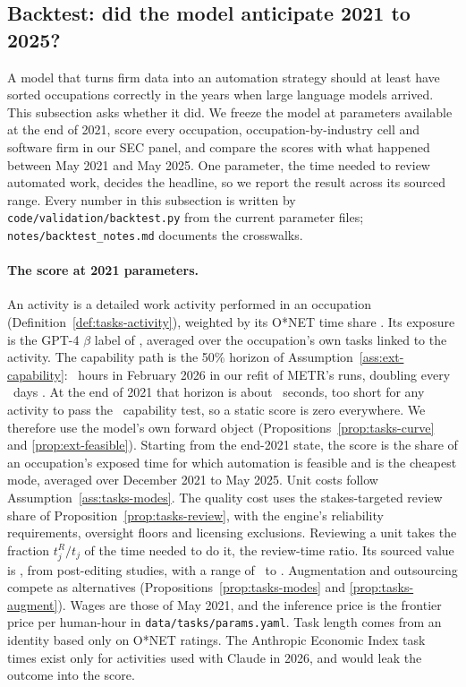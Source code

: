 \subsection{Backtest: did the model anticipate 2021 to 2025?}\label{sec:backtest}


A model that turns firm data into an automation strategy should at least have sorted occupations correctly in the years when large language models arrived. This subsection asks whether it did. We freeze the model at parameters available at the end of 2021, score every occupation, occupation-by-industry cell and software firm in our SEC panel, and compare the scores with what happened between May 2021 and May 2025. One parameter, the time needed to review automated work, decides the headline, so we report the result across its sourced range. Every number in this subsection is written by \texttt{code/\allowbreak validation/\allowbreak backtest.py} from the current parameter files; \texttt{notes/\allowbreak backtest\_notes.md} documents the crosswalks.

\paragraph{The score at 2021 parameters.} An activity is a detailed work activity performed in an occupation (Definition~\ref{def:tasks-activity}), weighted by its O*NET time share \citep{onet2026database}. Its exposure is the GPT-4 $\beta$ label of \citet{eloundou2024gpts}, averaged over the occupation's own tasks linked to the activity. The capability path is the 50\% horizon of Assumption~\ref{ass:ext-capability}: \btHzero\ hours in February 2026 in our refit of METR's runs, doubling every \btTd\ days \citep{kwa2025measuring}. At the end of 2021 that horizon is about \btHendSec\ seconds, too short for any activity to pass the \btRA\ capability test, so a static score is zero everywhere. We therefore use the model's own forward object (Propositions~\ref{prop:tasks-curve} and \ref{prop:ext-feasible}). Starting from the end-2021 state, the score is the share of an occupation's exposed time for which automation is feasible and is the cheapest mode, averaged over December 2021 to May 2025. Unit costs follow Assumption~\ref{ass:tasks-modes}. The quality cost uses the stakes-targeted review share of Proposition~\ref{prop:tasks-review}, with the engine's reliability requirements, oversight floors and licensing exclusions. Reviewing a unit takes the fraction $t^R_j/t_j$ of the time needed to do it, the review-time ratio. Its sourced value is \btRhoRev, from post-editing studies, with a range of \btRhoLo\ to \btRhoHi. Augmentation and outsourcing compete as alternatives (Propositions~\ref{prop:tasks-modes} and \ref{prop:tasks-augment}). Wages are those of May 2021, and the inference price is the frontier price per human-hour in \texttt{data/\allowbreak tasks/\allowbreak params.yaml}. Task length comes from an identity based only on O*NET ratings. The Anthropic Economic Index task times \citep{appel2026anthropic} exist only for activities used with Claude in 2026, and would leak the outcome into the score.


